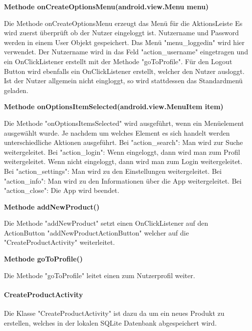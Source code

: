 \documentclass{scrartcl}
\begin{document}
\noindent\textbf{Methode onCreateOptionsMenu(android.view.Menu menu)}

\noindent Die Methode onCreateOptionsMenu erzeugt das Menü für die AktionsLeiste Es wird zuerst überprüft ob der Nutzer eingeloggt ist. Nutzername und Password werden in einem User Objekt gespeichert. Das Menü "menu\_loggedin" wird hier verwendet. Der Nutzername wird in das Feld "action\_username" eingetragen und ein OnClickListener erstellt mit der Methode "goToProfile". Für den Logout Button wird ebenfalls ein OnClickListener erstellt, welcher den Nutzer ausloggt. Ist der Nutzer allgemein nicht eingloggt, so wird stattdessen das Standardmenü geladen. \newline

\noindent\textbf{Methode onOptionsItemSelected(android.view.MenuItem item)} 

\noindent Die Methode "onOptionsItemsSelected" wird ausgeführt, wenn ein Menüelement ausgewählt wurde. Je nachdem um welches Element es sich handelt werden unterschiedliche Aktionen ausgeführt. Bei "action\_search": Man wird zur Suche weitergeleitet. Bei "action\_login": Wenn eingeloggt, dann wird man zum Profil weitergeleitet. Wenn nicht eingeloggt, dann wird man zum Login weitergeleitet. Bei "action\_settings": Man wird zu den Einstellungen weitergeleitet. Bei "action\_info": Man wird zu den Informationen über die App weitergeleitet. Bei "action\_close": Die App wird beendet. \newline

\noindent\textbf{Methode addNewProduct()} 

\noindent Die Methode "addNewProduct" setzt einen OnClickListener auf den ActionButton "addNewProductActionButton" welcher auf die "CreateProductActivity" weiterleitet. \newline

\noindent\textbf{Methode goToProfile()} 

\noindent Die Methode "goToProfile" leitet einen zum Nutzerprofil weiter. \newline

\paragraph{CreateProductActivity}

Die Klasse "CreateProductActivity" ist dazu da um ein neues Produkt zu erstellen, welches in der lokalen SQLite Datenbank abgespeichert wird. \newline
\end{document}
